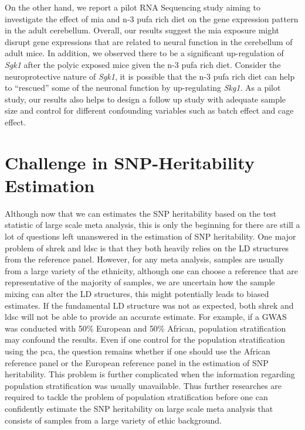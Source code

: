 \documentclass[12pt]{book}
\begin{document}
	On the other hand, we report a pilot RNA Sequencing study aiming to investigate the effect of \acrfull{mia} and n-3 \gls{pufa} rich diet on the gene expression pattern in the adult cerebellum. 
	Overall, our results suggest the \gls{mia} exposure might disrupt gene expressions that are related to neural function in the cerebellum of adult mice. 
	In addition, we observed there to be a significant up-regulation of \textit{Sgk1} after the \gls{polyic} exposed mice given the n-3 \gls{pufa} rich diet. 
	Consider the neuroprotective nature of \textit{Sgk1}, it is possible that the n-3 \gls{pufa} rich diet can help to ``rescued'' some of the neuronal function by up-regulating \textit{Skg1}.
	As a pilot study, our results also helps to design a follow up study with adequate sample size and control for different confounding variables such as batch effect and cage effect. 
	
	\section{Challenge in SNP-Heritability Estimation}
	Although now that we can estimates the \gls{SNP} heritability based on the test statistic of large scale meta analysis, this is only the beginning for there are still a lot of questions left unanswered in the estimation of \gls{SNP} heritability.
	One major problem of \gls{shrek} and \gls{ldsc} is that they both heavily relies on the \gls{LD} structures from the reference panel.
	However, for any meta analysis, samples are usually from a large variety of the ethnicity, although one can choose a reference that are representative of the majority of samples, we are uncertain how the sample mixing can alter the \gls{LD} structures, this might potentially leads to biased estimates.
	If the fundamental \gls{LD} structure was not as expected, both \gls{shrek} and \gls{ldsc} will not be able to provide an accurate estimate. 
	For example, if a \gls{GWAS} was conducted with 50\% European and 50\% African, population stratification may confound the results.
	Even if one control for the population stratification using the \gls{pca}, the question remains whether if one should use the African reference panel or the European reference panel in the estimation of \gls{SNP} heritability.
	This problem is further complicated when the information regarding population stratification was usually unavailable. 
	Thus further researches are required to tackle the problem of population stratification before one can confidently estimate the \gls{SNP} heritability on large scale meta analysis that consists of samples from a large variety of ethic background.
	
\end{document}
